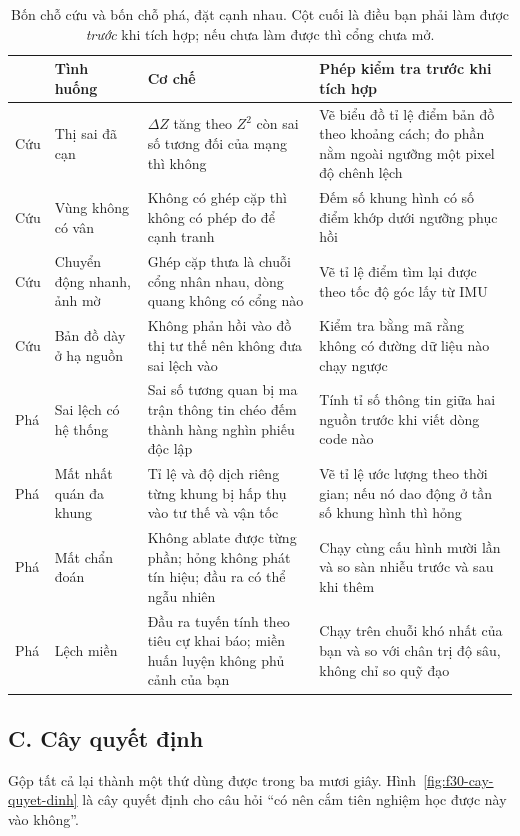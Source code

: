 \documentclass[../../deep_learning.tex]{subfiles}
\begin{document}
\begin{table}[H]\centering\footnotesize
\caption{Bốn chỗ cứu và bốn chỗ phá, đặt cạnh nhau. Cột cuối là điều bạn phải làm được \emph{trước} khi tích hợp; nếu chưa làm được thì cổng chưa mở.}
\label{tab:f30-cuu-pha}
\begin{tabularx}{\linewidth}{@{}L{1.5cm}L{3.3cm}YL{3.9cm}@{}}
\toprule
& \textbf{Tình huống} & \textbf{Cơ chế} & \textbf{Phép kiểm tra trước khi tích hợp}\\
\midrule
Cứu & Thị sai đã cạn & \(\Delta Z\) tăng theo \(Z^2\) còn sai số tương đối của mạng thì không & Vẽ biểu đồ tỉ lệ điểm bản đồ theo khoảng cách; đo phần nằm ngoài ngưỡng một pixel độ chênh lệch\\
Cứu & Vùng không có vân & Không có ghép cặp thì không có phép đo để cạnh tranh & Đếm số khung hình có số điểm khớp dưới ngưỡng phục hồi\\
Cứu & Chuyển động nhanh, ảnh mờ & Ghép cặp thưa là chuỗi cổng nhân nhau, dòng quang không có cổng nào & Vẽ tỉ lệ điểm tìm lại được theo tốc độ góc lấy từ IMU\\
Cứu & Bản đồ dày ở hạ nguồn & Không phản hồi vào đồ thị tư thế nên không đưa sai lệch vào & Kiểm tra bằng mã rằng không có đường dữ liệu nào chạy ngược\\
\midrule
Phá & Sai lệch có hệ thống & Sai số tương quan bị ma trận thông tin chéo đếm thành hàng nghìn phiếu độc lập & Tính tỉ số thông tin giữa hai nguồn trước khi viết dòng code nào\\
Phá & Mất nhất quán đa khung & Tỉ lệ và độ dịch riêng từng khung bị hấp thụ vào tư thế và vận tốc & Vẽ tỉ lệ ước lượng theo thời gian; nếu nó dao động ở tần số khung hình thì hỏng\\
Phá & Mất chẩn đoán & Không ablate được từng phần; hỏng không phát tín hiệu; đầu ra có thể ngẫu nhiên & Chạy cùng cấu hình mười lần và so sàn nhiễu trước và sau khi thêm\\
Phá & Lệch miền & Đầu ra tuyến tính theo tiêu cự khai báo; miền huấn luyện không phủ cảnh của bạn & Chạy trên chuỗi khó nhất của bạn và so với chân trị độ sâu, không chỉ so quỹ đạo\\
\bottomrule
\end{tabularx}
\end{table}

\subsection{C. Cây quyết định}
Gộp tất cả lại thành một thứ dùng được trong ba mươi giây. Hình~\ref{fig:f30-cay-quyet-dinh} là cây quyết định cho câu hỏi ``có nên cắm tiên nghiệm học được này vào không''.
\end{document}

